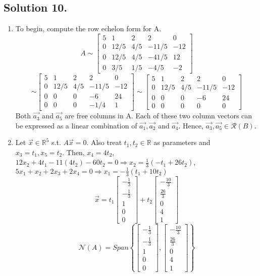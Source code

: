\documentclass{article}
\begin{document}
\subsection*{Solution 10.}
\begin{enumerate}
    \item To begin, compute the row echelon form for A.
\[A\sim \left[\begin{array}{rrrrr}5&1&2&2&0\\0&12/5&4/5&-11/5&-12\\0&12/5&4/5&-41/5&12\\0&3/5&1/5&-4/5&-2\end{array}\right]\]
\[\sim \left[\begin{array}{rrrrr}5&1&2&2&0\\0&12/5&4/5&-11/5&-12\\0&0&0&-6&24\\0&0&0&-1/4&1\end{array}\right]\sim \left[\begin{array}{rrrrr}5&1&2&2&0\\0&12/5&4/5&-11/5&-12\\0&0&0&-6&24\\0&0&0&0&0\end{array}\right]\]
Both $\Vec{a_3}$ and $\Vec{a_5}$ are free columns in A. Each of these two column vectors can be expressed as a linear combination of $\Vec{a_1},\Vec{a_2}$ and $\Vec{a_4}$. Hence, $\Vec{a_3},\Vec{a_5}\in \mathcal{R}(B)$.
\item Let $\Vec{x}\in\mathbb{R}^5$ s.t. $A\Vec{x}=0$. Also treat $t_1,t_2\in\mathbb{R}$ as parameters and $x_3=t_1,x_5=t_2$.\newline
Then, $x_4=4t_2$, $12x_2+4t_1-11(4t_2)-60t_2=0\Rightarrow x_2=\frac{1}{3}(-t_1+26t_2)$,\newline
$5x_1+x_2+2x_3+2x_4=0\Rightarrow x_1=-\frac{1}{3}(t_1+10t_2)$
\[\Vec{x}=t_1\left[\begin{array}{r}-\frac{1}{3}\\-\frac{1}{3}\\1\\0\\0\end{array}\right]+t_2\left[\begin{array}{r}-\frac{10}{3}\\\frac{26}{3}\\0\\4\\1\end{array}\right]\]
\[\mathcal{N}(A)=Span\left\{\left[\begin{array}{r}-\frac{1}{3}\\-\frac{1}{3}\\1\\0\\0\end{array}\right],\left[\begin{array}{r}-\frac{10}{3}\\\frac{26}{3}\\0\\4\\1\end{array}\right]\right\}\]

\end{enumerate}
\end{document}
